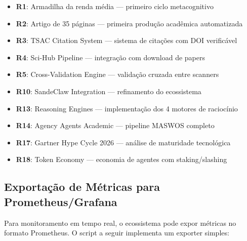 \begin{itemize}
  \item \textbf{R1}: Armadilha da renda média — primeiro ciclo metacognitivo
  \item \textbf{R2}: Artigo de 35 páginas — primeira produção acadêmica automatizada
  \item \textbf{R3}: TSAC Citation System — sistema de citações com DOI verificável
  \item \textbf{R4}: Sci-Hub Pipeline — integração com download de papers
  \item \textbf{R5}: Cross-Validation Engine — validação cruzada entre scanners
  \item \textbf{R10}: SandeClaw Integration — refinamento do ecossistema
  \item \textbf{R13}: Reasoning Engines — implementação dos 4 motores de raciocínio
  \item \textbf{R14}: Agency Agents Academic — pipeline MASWOS completo
  \item \textbf{R17}: Gartner Hype Cycle 2026 — análise de maturidade tecnológica
  \item \textbf{R18}: Token Economy — economia de agentes com staking/slashing
\end{itemize}

\subsection{Exportação de Métricas para Prometheus/Grafana}
\label{sec:prometheus}

Para monitoramento em tempo real, o ecossistema pode expor métricas no formato Prometheus. O script a seguir implementa um exporter simples:

